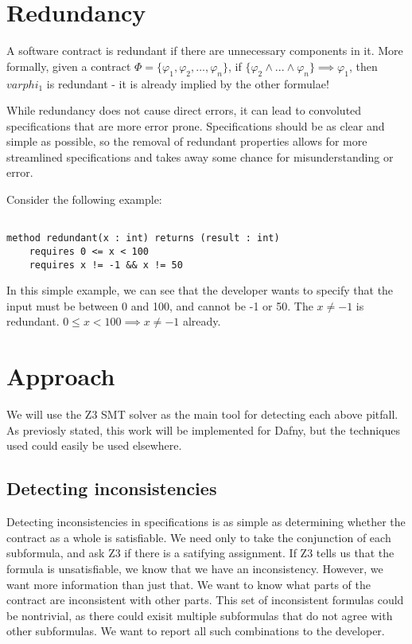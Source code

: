 \documentclass{article}
\begin{document}
\section{Redundancy}

A software contract is redundant if there are unnecessary components in it. More formally, given a contract
\(\Phi = \{\varphi_{1}, \varphi_{2}, ..., \varphi_{n}\}\), if \(\{\varphi_{2} \land ... \land \varphi_{n}\} \implies \varphi_{1}\), then
\(varphi_{1}\) is redundant - it is already implied by the other formulae!

While redundancy does not cause direct errors, it can lead to convoluted specifications that are more error prone. Specifications should be as
clear and simple as possible, so the removal of redundant properties allows for more streamlined specifications and takes away some chance
for misunderstanding or error.

Consider the following example:

\begin{lstlisting}

method redundant(x : int) returns (result : int)
    requires 0 <= x < 100
    requires x != -1 && x != 50

\end{lstlisting}

In this simple example, we can see that the developer wants to specify that the input must be between 0 and 100, and cannot be
-1 or 50. The \(x \neq -1\) is redundant. \(0 \leq x < 100 \implies x \neq -1\) already.

\section{Approach}

We will use the Z3 SMT solver as the main tool for detecting each above pitfall. As previosly stated,
this work will be implemented for Dafny, but the techniques used could easily be used elsewhere.

\subsection*{Detecting inconsistencies}

Detecting inconsistencies in specifications is as simple as determining whether the contract as a whole is satisfiable.
We need only to take the conjunction of each subformula, and ask Z3 if there is a satifying assignment. If Z3 tells us that the
formula is unsatisfiable, we know that we have an inconsistency. However, we want more information than just that. We
want to know what parts of the contract are inconsistent with other parts. This set of inconsistent formulas could be
nontrivial, as there could exisit multiple subformulas that do not agree with other subformulas. We want to report all
such combinations to the developer.
\end{document}
